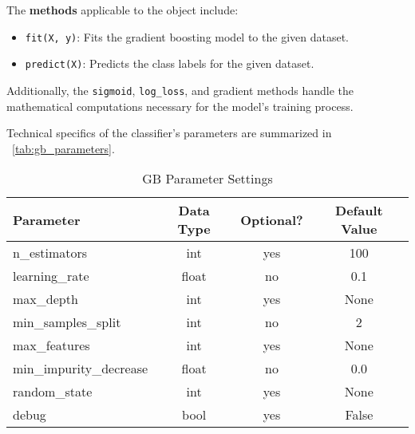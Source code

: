\begin{appendices}
  The \textbf{methods} applicable to the object include:
  \begin{itemize}
    \item \texttt{fit(X, y)}: Fits the gradient boosting model to the given dataset.
    \item \texttt{predict(X)}: Predicts the class labels for the given dataset.
  \end{itemize}

  Additionally, the \texttt{sigmoid}, \texttt{log\_loss}, and gradient methods handle the mathematical computations necessary for the model's training process.

  Technical specifics of the classifier's parameters are summarized in ~\autoref{tab:gb_parameters}.

  \begin{table}[H]
    \centering
    \begin{tabular}{lccc}
      \toprule
      \textbf{Parameter}      & \textbf{Data Type} & \textbf{Optional?} & \textbf{Default Value} \\
      \midrule
      n\_estimators           & int                & yes                & 100                    \\
      learning\_rate          & float              & no                 & 0.1                    \\
      max\_depth              & int                & yes                & None                   \\
      min\_samples\_split     & int                & no                 & 2                      \\
      max\_features           & int                & yes                & None                   \\
      min\_impurity\_decrease & float              & no                 & 0.0                    \\
      random\_state           & int                & yes                & None                   \\
      debug                   & bool               & yes                & False                  \\
      \bottomrule
    \end{tabular}
    \caption{GB Parameter Settings}
    \label{tab:gb_parameters}
  \end{table}
\end{appendices}
